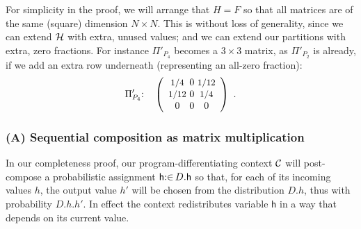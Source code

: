 \documentclass[runningheads]{llncs}
\newcommand\Vh {\mathsf{h}}
\newcommand\CC {{\cal C}}
\newcommand\HH {{\cal H}}
\begin{document}
For simplicity in the proof, we will arrange that $H{=}F$ so that all matrices are of the same (square) dimension $N{\times}N$. This is without loss of generality, since we can extend $\HH$ with extra, unused values; and we can extend  our partitions with extra, zero fractions. For instance $\Pi'_{P_4}$ becomes a $3{\times}3$ matrix, as $\Pi'_{P_2}$ is already, if we add an extra row underneath (representing an all-zero fraction):
\begin{equation}\label{e64957}
 \Pi_{P_4}'{:}\quad
  \left (\begin{array}{c@{~}c@{~}c}
          \IFrac{1}{4}  & 0 & \IFrac{1}{12} \\
          \IFrac{1}{12} & 0 & \IFrac{1}{4} \\
          0 & 0 & 0
         \end{array}
  \right)~.
\end{equation}

\subsubsection{(A) Sequential composition as matrix multiplication}

In our completeness proof, our program-differentiating context $\CC$ will post-compose a probabilistic assignment $\Vh\From D.\Vh$ so that, for each of its incoming values $h$, the output value $h'$ will be chosen from the distribution $D.h$, thus with probability $D.h.h'$. In effect the context redistributes variable $\Vh$ in a way that depends on its current value.
\end{document}
